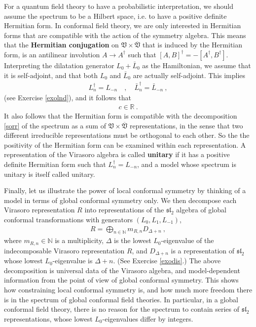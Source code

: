 \documentclass[12pt, a4paper, notitlepage, twoside]{report}
\numberwithin{equation}{section}
\theoremstyle{break}
\begin{document}
For a quantum field theory to have a probabilistic interpretation, 
we should assume the spectrum to be a Hilbert space, i.e. to have a positive definite Hermitian form. 
In conformal field theory, we are only interested in Hermitian forms that are compatible with the action of the symmetry algebra.
This means that the \textbf{Hermitian conjugation} on $\mathfrak{V}\times\overline{\mathfrak{V}}$ that is induced by the Hermitian form, is an antilinear involution $A\to A^\dagger$ such that $[A,B]^\dagger = -[A^\dagger, B^\dagger]$.
Interpreting the dilatation generator $L_0+\bar L_0$ as the Hamiltonian, we assume that it is self-adjoint, and that
both $L_0$ and $\bar L_0$ are actually self-adjoint.
This implies
\begin{align}
 L^\dagger_n = L_{-n} \quad , \quad \bar L_n^\dagger = \bar L_{-n}\ ,
\label{ldn}
\end{align}
(see Exercise \ref{exolnd}), and it follows that
\begin{align}
 c\in {\mathbb{R}}\ .
\label{cir}
\end{align}
It also follows that the Hermitian form is compatible with the decomposition \eqref{sorr} of the spectrum as a sum of $\mathfrak{V}\times \overline{\mathfrak{V}}$ representations, in the sense that two different irreducible representations must be orthogonal to each other.
So the the positivity of the Hermitian form can be examined within each representation.
A representation of the Virasoro algebra is called \textbf{\boldmath unitary} if it has a positive definite Hermitian form such that 
$L^\dagger_n = L_{-n}$, and a model whose spectrum is unitary is itself called unitary. 

Finally, let us illustrate the power of local conformal symmetry by thinking of a model in terms of global conformal symmetry only. 
We then decompose each Virasoro representation $R$ into representations of the $\mathfrak{sl}_2$ algebra of global conformal transformations with generators $(L_0,L_1,L_{-1})$,
\begin{align}
 R=\bigoplus_{n\in{\mathbb{N}}} m_{R,n} D_{\Delta+n}\ ,
\label{rbd}
\end{align}
where $m_{R,n}\in {\mathbb{N}}$ is a multiplicity, $\Delta$ is the lowest $L_0$-eigenvalue of the indecomposable Virasoro representation $R$, and $D_{\Delta+n}$ is a representation of $\mathfrak{sl}_2$ whose lowest $L_0$-eigenvalue is $\Delta+n$.
(See Exercise \ref{exodis}.)
The above decomposition is universal data of the Virasoro algebra, and 
model-dependent information from the point of view of global conformal symmetry.
This shows how constraining local conformal symmetry is, and how much more freedom there is in the spectrum of global conformal field theories.
In particular, in a global conformal field theory, there is no reason for the spectrum to contain series of
$\mathfrak{sl}_2$ representations, whose lowest $L_0$-eigenvalues differ by integers. 
\end{document}
